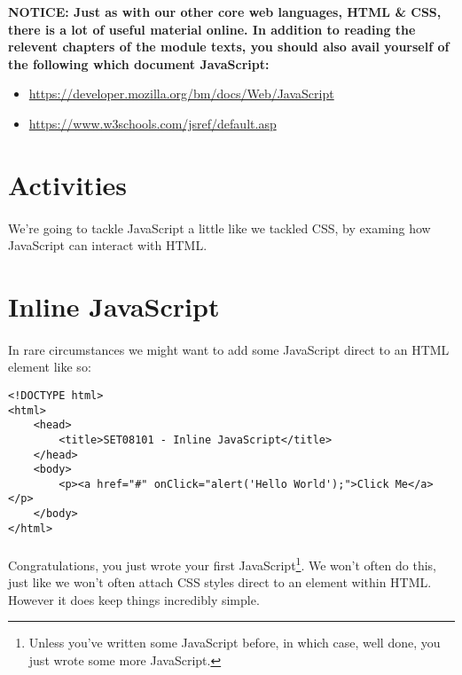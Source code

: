 \documentclass[10pt, a4paper, twosize]{article}
\begin{document}
\begin{framed}
{\bf{NOTICE:} Just as with our other core web languages, HTML \& CSS, there is a lot of useful material online. In addition to reading the relevent chapters of the module texts, you should also avail yourself of the following which document JavaScript:
\begin{itemize}
\item \url{https://developer.mozilla.org/bm/docs/Web/JavaScript}
\item \url{https://www.w3schools.com/jsref/default.asp}
\end{itemize}
  }
\end{framed}


\section{Activities}
\paragraph{} We're going to tackle JavaScript a little like we tackled CSS, by examing how JavaScript can interact with HTML.

\section{Inline JavaScript}

\paragraph{} In rare circumstances we might want to add some JavaScript direct to an HTML element like so:

\begin{lstlisting}
<!DOCTYPE html>
<html>
    <head>
        <title>SET08101 - Inline JavaScript</title>
    </head>
    <body>
        <p><a href="#" onClick="alert('Hello World');">Click Me</a></p> 
    </body>
</html>
\end{lstlisting}

\paragraph{} Congratulations, you just wrote your first JavaScript\footnote{Unless you've written some JavaScript before, in which case, well done, you just wrote some more JavaScript.}. We won't often do this, just like we won't often attach CSS styles direct to an element within HTML. However it does keep things incredibly simple.
\end{document}
